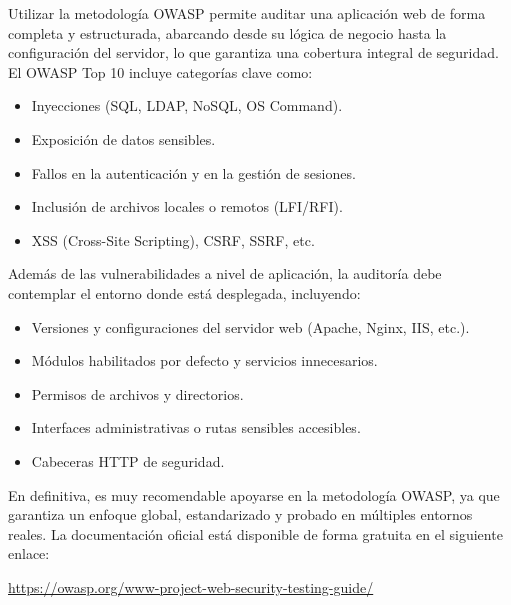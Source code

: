 \documentclass[a4paper, 11pt]{article}
\begin{document}
Utilizar la metodología OWASP permite auditar una aplicación web de forma completa y estructurada, abarcando desde su lógica de negocio hasta la configuración del servidor, lo que garantiza una cobertura integral de seguridad. El OWASP Top 10 incluye categorías clave como:

\begin{itemize}
\item Inyecciones (SQL, LDAP, NoSQL, OS Command).
\item Exposición de datos sensibles.
\item Fallos en la autenticación y en la gestión de sesiones.
\item Inclusión de archivos locales o remotos (LFI/RFI).
\item XSS (Cross-Site Scripting), CSRF, SSRF, etc.
\end{itemize}

Además de las vulnerabilidades a nivel de aplicación, la auditoría debe contemplar el entorno donde está desplegada, incluyendo:

\begin{itemize}
\item Versiones y configuraciones del servidor web (Apache, Nginx, IIS, etc.).
\item Módulos habilitados por defecto y servicios innecesarios.
\item Permisos de archivos y directorios.
\item Interfaces administrativas o rutas sensibles accesibles.
\item Cabeceras HTTP de seguridad.
\end{itemize}


En definitiva, es muy recomendable apoyarse en la metodología OWASP, ya que garantiza un enfoque global, estandarizado y probado en múltiples entornos reales. La documentación oficial está disponible de forma gratuita en el siguiente enlace:

\begin{tcolorbox}[enhanced,attach boxed title to top center={yshift=-3mm,yshifttext=-1mm},
  colback=blue!5!white,colframe=blue!75!black,colbacktitle=red!80!black,
  title=Dirección URL,fonttitle=\bfseries,
  boxed title style={size=small,colframe=red!50!black} ]
  \centering
\url{https://owasp.org/www-project-web-security-testing-guide/}

\end{tcolorbox}


\end{document}
